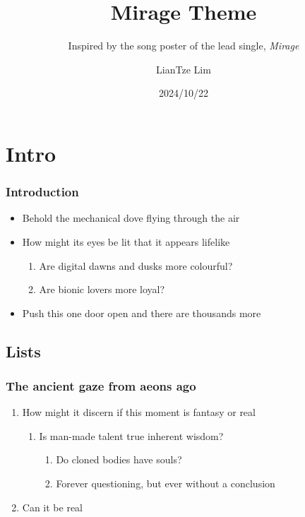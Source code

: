 \documentclass[aspectratio=1610]{beamer}
\title{Mirage Theme}
\subtitle{Inspired by the song poster of the lead single, \emph{Mirage}}
\author{LianTze Lim}
\institute{The full album \emph{Shenself} now available on all major music  platforms}
\date{2024/10/22}
\begin{document}
\frame{\maketitle}

\section{Intro}
\begin{frame}
\frametitle{Introduction}

\begin{itemize}
    \item Behold the mechanical dove \faDove{} flying through the air 
    \item How might its eyes be lit \faEye[regular] that it appears lifelike

\begin{enumerate}
    \item Are digital dawns and dusks \faCloudSun{} more colourful? \faCloudMoon
    \item Are bionic lovers \faGrinHearts{} more loyal? \faGrin*[regular]
\end{enumerate}

    \item Push this one door open \faDoorOpen{} and there are thousands more \faDoorClosed{\small\faDoorClosed}{\footnotesize\faDoorClosed}{\scriptsize\faDoorClosed}{\tiny\faDoorClosed}
\end{itemize}

\end{frame}

\subsection{Lists}
\begin{frame}
\frametitle{The ancient gaze from aeons ago}
    \begin{enumerate}
        \item How might it discern if this moment is fantasy or real
        \begin{enumerate}
	        \item Is man-made talent true inherent wisdom?
	        \begin{enumerate}
		        \item Do cloned bodies have souls?
		        \item Forever questioning, but ever without a conclusion
	        \end{enumerate}
        \end{enumerate}
        \item \alert{Can it be real}
    \end{enumerate}

\end{frame}
\end{document}
